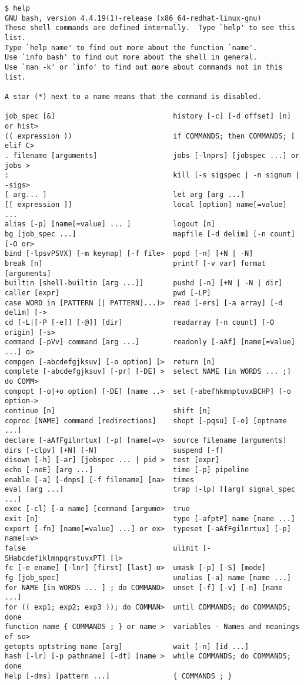 \vspace{-15pt}
\begin{verbatim}
$ help
GNU bash, version 4.4.19(1)-release (x86_64-redhat-linux-gnu)
These shell commands are defined internally.  Type `help' to see this list.
Type `help name' to find out more about the function `name'.
Use `info bash' to find out more about the shell in general.
Use `man -k' or `info' to find out more about commands not in this list.

A star (*) next to a name means that the command is disabled.

job_spec [&]                            history [-c] [-d offset] [n] or hist>
(( expression ))                        if COMMANDS; then COMMANDS; [ elif C>
. filename [arguments]                  jobs [-lnprs] [jobspec ...] or jobs >
:                                       kill [-s sigspec | -n signum | -sigs>
[ arg... ]                              let arg [arg ...]
[[ expression ]]                        local [option] name[=value] ...
alias [-p] [name[=value] ... ]          logout [n]
bg [job_spec ...]                       mapfile [-d delim] [-n count] [-O or>
bind [-lpsvPSVX] [-m keymap] [-f file>  popd [-n] [+N | -N]
break [n]                               printf [-v var] format [arguments]
builtin [shell-builtin [arg ...]]       pushd [-n] [+N | -N | dir]
caller [expr]                           pwd [-LP]
case WORD in [PATTERN [| PATTERN]...)>  read [-ers] [-a array] [-d delim] [->
cd [-L|[-P [-e]] [-@]] [dir]            readarray [-n count] [-O origin] [-s>
command [-pVv] command [arg ...]        readonly [-aAf] [name[=value] ...] o>
compgen [-abcdefgjksuv] [-o option] [>  return [n]
complete [-abcdefgjksuv] [-pr] [-DE] >  select NAME [in WORDS ... ;] do COMM>
compopt [-o|+o option] [-DE] [name ..>  set [-abefhkmnptuvxBCHP] [-o option->
continue [n]                            shift [n]
coproc [NAME] command [redirections]    shopt [-pqsu] [-o] [optname ...]
declare [-aAfFgilnrtux] [-p] [name[=v>  source filename [arguments]
dirs [-clpv] [+N] [-N]                  suspend [-f]
disown [-h] [-ar] [jobspec ... | pid >  test [expr]
echo [-neE] [arg ...]                   time [-p] pipeline
enable [-a] [-dnps] [-f filename] [na>  times
eval [arg ...]                          trap [-lp] [[arg] signal_spec ...]
exec [-cl] [-a name] [command [argume>  true
exit [n]                                type [-afptP] name [name ...]
export [-fn] [name[=value] ...] or ex>  typeset [-aAfFgilnrtux] [-p] name[=v>
false                                   ulimit [-SHabcdefiklmnpqrstuvxPT] [l>
fc [-e ename] [-lnr] [first] [last] o>  umask [-p] [-S] [mode]
fg [job_spec]                           unalias [-a] name [name ...]
for NAME [in WORDS ... ] ; do COMMAND>  unset [-f] [-v] [-n] [name ...]
for (( exp1; exp2; exp3 )); do COMMAN>  until COMMANDS; do COMMANDS; done
function name { COMMANDS ; } or name >  variables - Names and meanings of so>
getopts optstring name [arg]            wait [-n] [id ...]
hash [-lr] [-p pathname] [-dt] [name >  while COMMANDS; do COMMANDS; done
help [-dms] [pattern ...]               { COMMANDS ; }
\end{verbatim}
\vspace{-10pt}	

